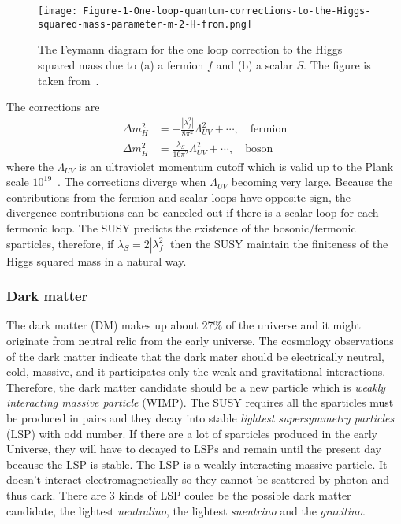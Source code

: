 \begin{figure}[htbp]
\begin{center}
\texttt{[image: Figure-1-One-loop-quantum-corrections-to-the-Higgs-squared-mass-parameter-m-2-H-from.png]}
\caption{The Feymann diagram for the one loop correction to the Higgs squared mass due to (a) a fermion $f$ and (b) a scalar $S$.
The figure is taken from~\cite{Martin:1997ns}.}
\label{fig:susy_one_loop_corrections}
\end{center}
\end{figure}

The corrections are
%
\begin{align}
\Delta m_{H}^{2} &= - \frac{|\lambda_{f}^{2}|}{8\pi^{2}} \Lambda_{UV}^{2} + \cdots, \quad \mathrm{fermion}\\
\Delta m_{H}^{2} &= \frac{\lambda_{S}}{16\pi^{2}} \Lambda_{UV}^{2} + \cdots, \quad \mathrm{boson}
\end{align}
%
where the $\Lambda_{UV}$ is an ultraviolet momentum cutoff which is valid up to the Plank scale $10^{19}$~{\GeV}.
The corrections diverge when $\Lambda_{UV}$ becoming very large.
Because the contributions from the fermion and scalar loops have opposite sign, the divergence contributions can be canceled out if there is a scalar loop for each fermonic loop.
The SUSY predicts the existence of the bosonic/fermonic sparticles, therefore, if $\lambda_{S} = 2 |\lambda_{f}^{2}|$ then the SUSY maintain the finiteness of the Higgs squared mass in a natural way.


\subsubsection{Dark matter}
\label{subsubsec:susy_dark_matter}
The dark matter (DM) makes up about 27\% of the universe and it might originate from neutral relic from the early universe.
The cosmology observations of the dark matter indicate that the dark mater should be electrically neutral, cold, massive, and it participates only the weak and gravitational interactions.
Therefore, the dark matter candidate should be a new particle which is \textit{weakly interacting massive particle} (WIMP).
The SUSY requires all the sparticles must be produced in pairs and they decay into stable \textit{lightest supersymmetry particles} (LSP) with odd number.
If there are a lot of sparticles produced in the early Universe, they will have to decayed to LSPs and remain until the present day because the LSP is stable.
The LSP is a weakly interacting massive particle.
It doesn't interact electromagnetically so they cannot be scattered by photon and thus dark.
There are 3 kinds of LSP coulee be the possible dark matter candidate, the lightest \textit{neutralino}, the lightest \textit{sneutrino} and the \textit{gravitino}.


